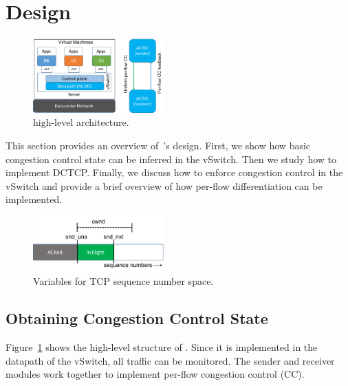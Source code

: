 \section{Design}
\label{design}
\begin{figure}[!t]
        \centering
  \includegraphics[width=0.45\textwidth]{figures/acdc_highlevel.pdf}
        \caption{\acdc{} high-level architecture.}
        \label{acdc_highlevel}
\end{figure}

This section provides an overview of~\acdc{}'s design. First, we show how basic
congestion control state can be inferred in the vSwitch. Then we study
how to implement DCTCP. Finally, we discuss how to enforce congestion
control in the vSwitch and provide a brief overview of how per-flow differentiation
can be implemented.


\begin{figure}[th]
        \centering
  \includegraphics[width=0.45\textwidth]{figures/tcp-state-new.pdf}
        \caption{Variables for TCP sequence number space.}
        \label{tcpstate}
\end{figure}
\subsection{Obtaining Congestion Control State}
\label{ss:tcpstate}
Figure~\ref{acdc_highlevel} shows the high-level structure of \acdc{}. Since it is
implemented in the datapath of the vSwitch, all traffic can be monitored. The sender
and receiver modules work together to implement per-flow congestion control (CC).

